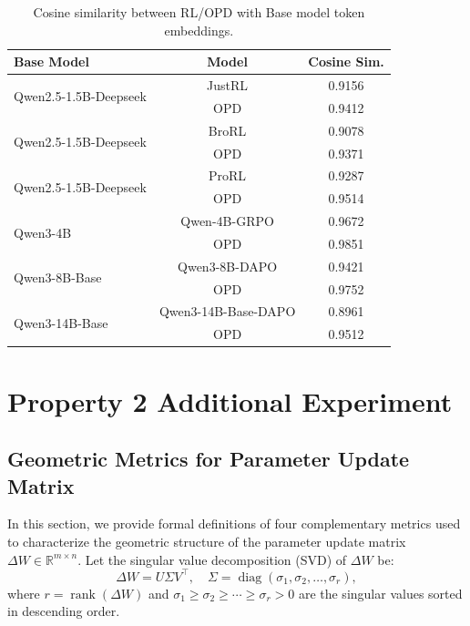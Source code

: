 \documentclass{llmxive}
\begin{document}
\begin{table}[t]
\centering
\setlength{\tabcolsep}{4pt}
\label{embed_similarity}
\begin{tabular}{lcc}
\toprule
\textbf{Base Model} & \textbf{Model} & \textbf{Cosine Sim.} \\
\midrule
\multirow{2}{*}{Qwen2.5-1.5B-Deepseek} & JustRL \citep{he2025justrlscaling15bllm} & 0.9156 \\
                                     & OPD & 0.9412 \\
\midrule
\multirow{2}{*}{Qwen2.5-1.5B-Deepseek} & BroRL \citep{Hu2025BroRLSR} & 0.9078 \\
                  & OPD & 0.9371 \\
\midrule
\multirow{2}{*}{Qwen2.5-1.5B-Deepseek} & ProRL \citep{Liu2025ProRLPR} & 0.9287 \\
                  & OPD & 0.9514 \\
\midrule
\multirow{2}{*}{Qwen3-4B} & Qwen-4B-GRPO \citep{Yang2026LearningBT} & 0.9672 \\
                          & OPD & 0.9851 \\
\midrule
\multirow{2}{*}{Qwen3-8B-Base} & Qwen3-8B-DAPO \citep{cai2025predictability} & 0.9421 \\
                              & OPD & 0.9752 \\
\midrule
\multirow{2}{*}{Qwen3-14B-Base} & Qwen3-14B-Base-DAPO & 0.8961 \\
                                & OPD & 0.9512 \\
\bottomrule
\end{tabular}
\caption{Cosine similarity between RL/OPD with Base model token embeddings.}
\end{table}





\section{Property 2 Additional Experiment}
\label{Property 2 Additional Experiment}


\subsection{Geometric Metrics for Parameter Update Matrix}
\label{Geometric Metrics for Parameter Update Matrix}

In this section, we provide formal definitions of four complementary metrics used to characterize the geometric structure of the parameter update matrix $\Delta W \in \mathbb{R}^{m \times n}$. Let the singular value decomposition (SVD) of $\Delta W$ be:
\begin{equation}
\Delta W = U \Sigma V^\top, \quad \Sigma = \operatorname{diag}(\sigma_1, \sigma_2, \ldots, \sigma_r),
\end{equation}
where $r = \operatorname{rank}(\Delta W)$ and $\sigma_1 \ge \sigma_2 \ge \cdots \ge \sigma_r > 0$ are the singular values sorted in descending order.
\end{document}
